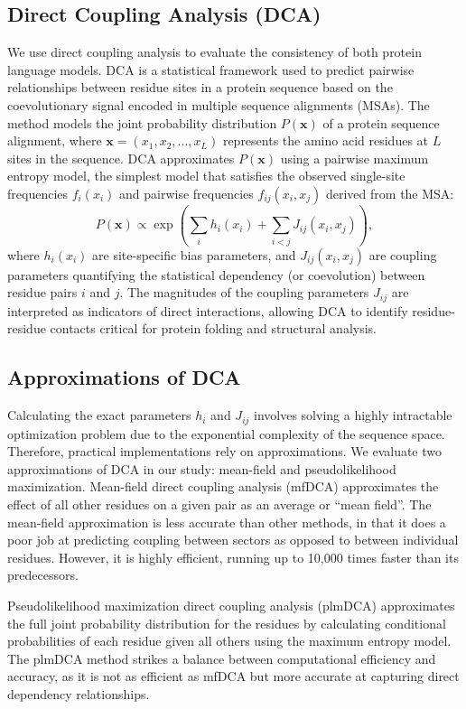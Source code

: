 \documentclass{article}
\begin{document}
\subsection{Direct Coupling Analysis (DCA)}
We use direct coupling analysis to evaluate the consistency of both protein language models. DCA is a statistical framework used to predict pairwise relationships between residue sites in a protein sequence based on the coevolutionary signal encoded in multiple sequence alignments (MSAs). The method models the joint probability distribution \( P(\mathbf{x}) \) of a protein sequence alignment, where \( \mathbf{x} = (x_1, x_2, \ldots, x_L) \) represents the amino acid residues at \( L \) sites in the sequence. DCA approximates \( P(\mathbf{x}) \) using a pairwise maximum entropy model, the simplest model that satisfies the observed single-site frequencies \( f_i(x_i) \) and pairwise frequencies \( f_{ij}(x_i, x_j) \) derived from the MSA:  
\[
P(\mathbf{x}) \propto \exp\left(\sum_{i} h_i(x_i) + \sum_{i<j} J_{ij}(x_i, x_j)\right),
\]  
where \( h_i(x_i) \) are site-specific bias parameters, and \( J_{ij}(x_i, x_j) \) are coupling parameters quantifying the statistical dependency (or coevolution) between residue pairs \( i \) and \( j \). The magnitudes of the coupling parameters \( J_{ij} \) are interpreted as indicators of direct interactions, allowing DCA to identify residue-residue contacts critical for protein folding and structural analysis. 

\subsection{Approximations of DCA}

Calculating the exact parameters \( h_i \) and \( J_{ij} \) involves solving a highly intractable optimization problem due to the exponential complexity of the sequence space. Therefore, practical implementations rely on approximations. We evaluate two approximations of DCA in our study: mean-field and pseudolikelihood maximization. Mean-field direct coupling analysis\cite{Morcos} (mfDCA) approximates the effect of all other residues on a given pair as an average or ``mean field''. The mean-field approximation is less accurate than other methods, in that it does a poor job at predicting coupling between sectors as opposed to between individual residues. However, it is highly efficient, running up to 10,000 times faster than its predecessors.

Pseudolikelihood maximization direct coupling analysis (plmDCA)\cite{ekeberg} approximates the full joint probability distribution for the residues by calculating conditional probabilities of each residue given all others using the maximum entropy model. The plmDCA method strikes a balance between computational efficiency and accuracy, as it is not as efficient as mfDCA but more accurate at capturing direct dependency relationships.
\end{document}

